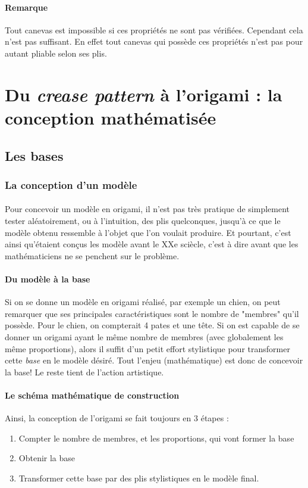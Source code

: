 \documentclass[a4paper,12pt,french]{report}
\begin{document}
		\paragraph{Remarque}
		Tout canevas est impossible si ces propriétés ne sont pas 
		vérifiées. Cependant cela n'est pas suffisant. En effet tout 
		canevas qui possède ces propriétés n'est pas pour autant 
		pliable selon ses plis.

      

		\section{Du \emph{crease pattern} à l'origami : la conception mathématisée}
		
			\subsection{Les bases}
				\subsubsection{La conception d'un modèle}
					\paragraph{}
					Pour concevoir un modèle en origami, il n'est pas très pratique de simplement tester aléatoirement, ou à l'intuition, des plis quelconques, jusqu'à ce que le modèle obtenu ressemble à l'objet que l'on voulait produire. Et pourtant, c'est ainsi qu'étaient conçus les modèle avant le XXe sciècle, c'est à dire avant que les mathématiciens ne se penchent sur le problème.
					\paragraph{Du modèle à la base}
					Si on se donne un modèle en origami réalisé, par exemple un chien, on peut remarquer que ses principales caractéristiques sont le nombre de "membres" qu'il possède. Pour le chien, on compterait 4 pates et une tête. Si on est capable de se donner un origami ayant le même nombre de membres (avec globalement les même proportions), alors il suffit d'un petit effort stylistique pour transformer cette \emph{base} en le modèle désiré. Tout l'enjeu (mathématique) est donc de concevoir la base! Le reste tient de l'action artistique.
					\paragraph{Le schéma mathématique de construction}
					Ainsi, la conception de l'origami se fait toujours en 3 étapes :
					\begin{enumerate}
						\item Compter le nombre de membres, et les proportions, qui vont former la base
						\item Obtenir la base
						\item Transformer cette base par des plis stylistiques en le modèle final.
					\end{enumerate}
\end{document}
